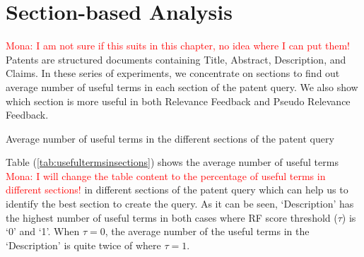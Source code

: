 \section{Section-based Analysis}
\textcolor{red}{Mona: I am not sure if this suits in this chapter, no idea where I can put them!}\\
Patents are structured documents containing Title, Abstract, Description, and Claims. In these series of experiments, we concentrate on sections to find out average number of useful terms in each section of the patent query. We also show which section is more useful in both Relevance Feedback and Pseudo Relevance Feedback.
\begin{table}[t!]
  \begin{center}
   \caption{Average number of useful terms in the different sections of the patent query}
     
  \label{tab:usefultermsinsections}
  \end{center}  
\end{table}
\FloatBarrier
Table (\ref{tab:usefultermsinsections}) shows the average number of useful terms \textcolor{red}{Mona: I will change the table content to the percentage of useful terms in different sections!} in different sections of the patent query which can help us to identify the best section to create the query.
As it can be seen, `Description' has the highest number of useful terms in both cases where RF score threshold ($ \tau $) is `0' and `1'. When $ \tau = 0 $, the average number of the useful terms in the `Description' is quite twice of where $ \tau = 1 $. 

